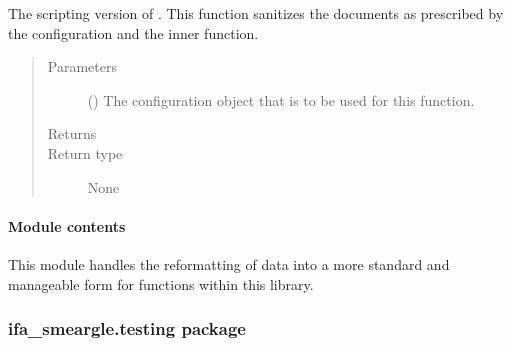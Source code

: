 \documentclass[letterpaper,10pt,english]{sphinxmanual}
\begin{document}

\begin{fulllineitems}
\label{\detokenize{docstrings/ifa_smeargle.reformat.sanitization:ifa_smeargle.reformat.sanitization.script_sanitize_file_size}}
The scripting version of . This function
sanitizes the documents as prescribed by the configuration and
the inner function.
\begin{quote}\begin{description}
\item[{Parameters}] \leavevmode
{} () \textendash{} The configuration object that is to be used for this
function.

\item[{Returns}] \leavevmode


\item[{Return type}] \leavevmode
None

\end{description}\end{quote}

\end{fulllineitems}



\paragraph{Module contents}
\label{\detokenize{docstrings/ifa_smeargle.reformat:module-ifa_smeargle.reformat}}\label{\detokenize{docstrings/ifa_smeargle.reformat:module-contents}}
This module handles the reformatting of data into a more standard and
manageable form for functions within this library.


\subsubsection{ifa\_smeargle.testing package}
\label{\detokenize{docstrings/ifa_smeargle.testing:ifa-smeargle-testing-package}}\label{\detokenize{docstrings/ifa_smeargle.testing::doc}}
\end{document}
